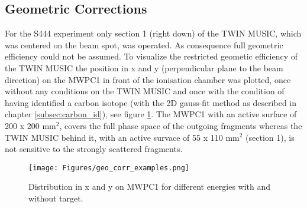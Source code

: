 \subsection{Geometric Corrections}
For the S444 experiment only section 1 (right down) of the TWIN MUSIC, which was centered on the beam spot, was operated. As consequence full geometric efficiency could not be assumed. To visualize the restricted geometic efficiency of the TWIN MUSIC the position in x and y (perpendicular plane to the beam direction) on the MWPC1 in front of the ionisation chamber was plotted, once without any conditions on the TWIN MUSIC and once with the condition of having identified a carbon isotope (with the 2D gauss-fit method as described in chapter \ref{subsec:carbon_id}), see figure \ref{fig:mw1_xy}. The MWPC1 with an active surface of 200 x 200 mm$^{2}$, covers the full phase space of the outgoing fragments whereas the TWIN MUSIC behind it, with an active survace of 55 x 110 mm$^{2}$ (section 1), is not sensitive to the strongly scattered fragments.\newline
\begin{figure}[htpb]
    \centering
    \texttt{[image: Figures/geo\_corr\_examples.png]}
    \caption{
    Distribution in x and y on MWPC1 for different energies with and without target. 
     }
    \label{fig:mw1_xy}
\end{figure}

